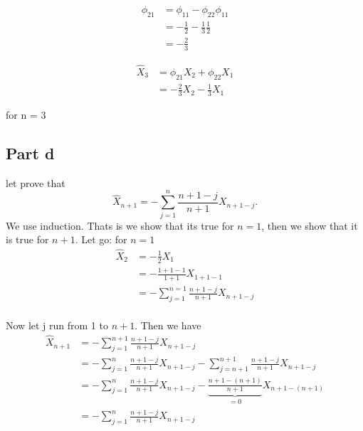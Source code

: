 \documentclass[11pt, oneside]{article}   	%
\begin{document}
 \begin{equation}
 \begin{split}
 \phi_{21} &= \phi_{11} - \phi_{22}\phi_{11}\\
 &= -\frac{1}{2}-\frac{1}{3}\frac{1}{2}\\
 & = -\frac{2}{3}
 \end{split}
 \end{equation}
 
 \begin{equation}
 \begin{split}
  \widehat{X}_{3}&=\phi_{21}X_{2} + \phi_{22}X_{1}\\
  &=-\frac{2}{3}X_{2}-\frac{1}{3}X_{1}
  \end{split}
 \end{equation}
 
for n = 3

\subsection{Part d}
let prove that 
\begin{equation}
\widehat{X}_{n+1} = -\sum_{j=1}^{n}\frac{n+1-j}{n+1}X_{n+1-j}.
\end{equation}
We use induction. Thats is we show that its true for $n = 1$, then we show that it is true for $n+1$. Let go:
for $n = 1$
\begin{equation}
\begin{split}
 \widehat{X}_{2} &= -\frac{1}{2}X_{1}\\
 &=-\frac{1+1-1}{1+1}X_{1+1-1}\\
 &=-\sum_{j=1}^{n=1}\frac{n+1-j}{n+1}X_{n+1-j}\\
 \end{split}
 \end{equation}

Now let j run from 1 to $n+1$. Then we have 
 \begin{equation}
 \begin{split}
\widehat{X}_{n+1} &= -\sum_{j=1}^{n+1}\frac{n+1-j}{n+1}X_{n+1-j}\\
&= -\sum_{j=1}^{n}\frac{n+1-j}{n+1}X_{n+1-j} -\sum_{j=n+1}^{n+1}\frac{n+1-j}{n+1}X_{n+1-j}\\
&= -\sum_{j=1}^{n}\frac{n+1-j}{n+1}X_{n+1-j} -\underbrace{\frac{n+1-(n+1)}{n+1}}_{ = 0}X_{n+1-(n+1)}\\
&=-\sum_{j=1}^{n}\frac{n+1-j}{n+1}X_{n+1-j}
\end{split}
\end{equation}
\end{document}

